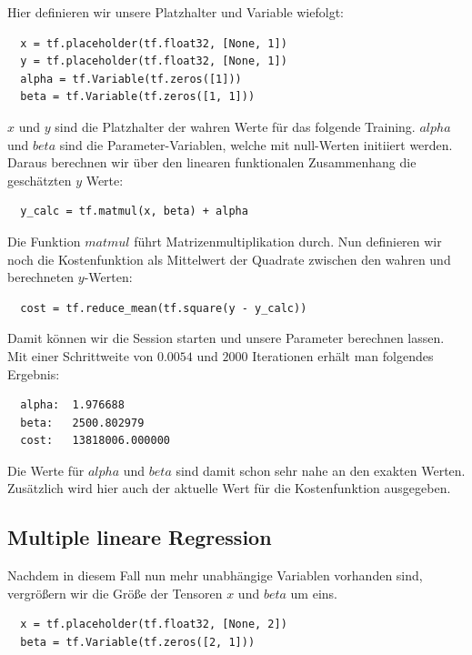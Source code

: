 Hier definieren wir unsere Platzhalter und Variable wiefolgt:

\begin{lstlisting}
  x = tf.placeholder(tf.float32, [None, 1])
  y = tf.placeholder(tf.float32, [None, 1])
  alpha = tf.Variable(tf.zeros([1]))
  beta = tf.Variable(tf.zeros([1, 1]))
\end{lstlisting}

$x$ und $y$ sind die Platzhalter der wahren Werte für das folgende Training. $alpha$ und $beta$ sind die Parameter-Variablen, welche mit null-Werten initiiert werden. Daraus berechnen wir über den linearen funktionalen Zusammenhang die geschätzten $y$ Werte:

\begin{lstlisting}
  y_calc = tf.matmul(x, beta) + alpha
\end{lstlisting}

Die Funktion $matmul$ führt Matrizenmultiplikation durch. Nun definieren wir noch die Kostenfunktion als Mittelwert der Quadrate zwischen den wahren und berechneten $y$-Werten:

\begin{lstlisting}
  cost = tf.reduce_mean(tf.square(y - y_calc))
\end{lstlisting}

Damit können wir die Session starten und unsere Parameter berechnen lassen. Mit einer Schrittweite von $0.0054$ und $2000$ Iterationen erhält man folgendes Ergebnis:

\begin{lstlisting}
  alpha:  1.976688
  beta:   2500.802979
  cost:   13818006.000000
\end{lstlisting}

Die Werte für $alpha$ und $beta$ sind damit schon sehr nahe an den exakten Werten. Zusätzlich wird hier auch der aktuelle Wert für die Kostenfunktion ausgegeben.

\subsection{Multiple lineare Regression}

Nachdem in diesem Fall nun mehr unabhängige Variablen vorhanden sind, vergrößern wir die Größe der Tensoren $x$ und $beta$ um eins.

\begin{lstlisting}
  x = tf.placeholder(tf.float32, [None, 2])
  beta = tf.Variable(tf.zeros([2, 1]))
\end{lstlisting}

